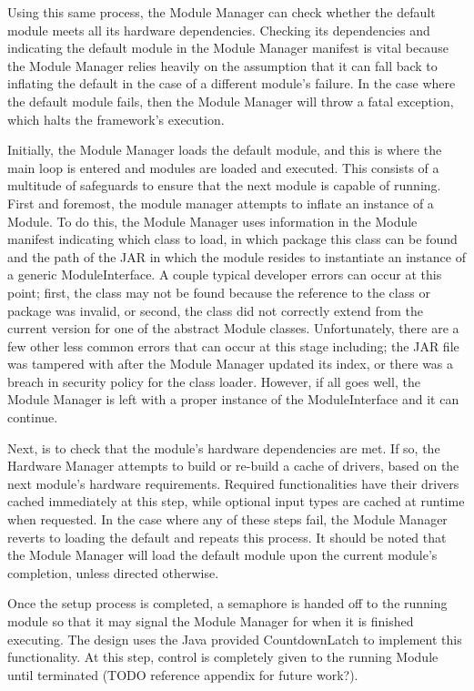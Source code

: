 \documentclass[11pt,letterpaper]{article}
\begin{document}
	Using this same process, the Module Manager can check whether the default
	module meets all its hardware dependencies. Checking its dependencies and
	indicating the default module in the Module Manager manifest is vital because
	the Module Manager relies heavily on the assumption that it can fall back to
	inflating the default in the case of a different module's failure. In the case
	where the default module fails, then the Module Manager will throw a fatal
	exception, which halts the framework's execution.

	Initially, the Module Manager loads the default module, and this is where 
	the main loop is entered and modules are loaded and executed. This 
	consists of a multitude of safeguards to ensure that the next module is 
	capable of running. First and foremost, the module manager attempts to inflate
	an instance of a Module. To do this, the Module Manager uses information in
	the Module manifest indicating which class to load, in which package this
	class can be found and the path of the JAR in which the module resides to
	instantiate an instance of a generic ModuleInterface.  A couple typical
	developer errors can occur at this point; first, the class may not be found
	because the reference to the class or package was invalid, or second, the
	class did not correctly extend from the current version for one of the
	abstract Module classes. Unfortunately, there are a few other less common
	errors that can occur at this stage including; the JAR file was tampered with
	after the Module Manager updated its index, or there was a breach in security
	policy for the class loader. However, if all goes well, the Module Manager is
	left with a proper instance of the ModuleInterface and it can continue.
	
	Next, is to check that the module's hardware dependencies are met. If so, the
	Hardware Manager attempts to build or re-build a cache of drivers, based on
	the next module's hardware requirements. Required functionalities have their
	drivers cached immediately at this step, while optional input types are cached
	at runtime when requested. In the case where any of these steps fail,  the
	Module Manager reverts to loading the default and repeats this process. It
	should be noted that the Module Manager will load the default module upon the
	current module's completion, unless directed otherwise.

	Once the setup process is completed, a semaphore is handed off to the running
	module so that it may signal the Module Manager for when it is finished
	executing. The design uses the Java provided CountdownLatch to implement this
	functionality. At this step, control is completely given to the running Module
	until terminated (TODO reference appendix for future work?).
\end{document}
